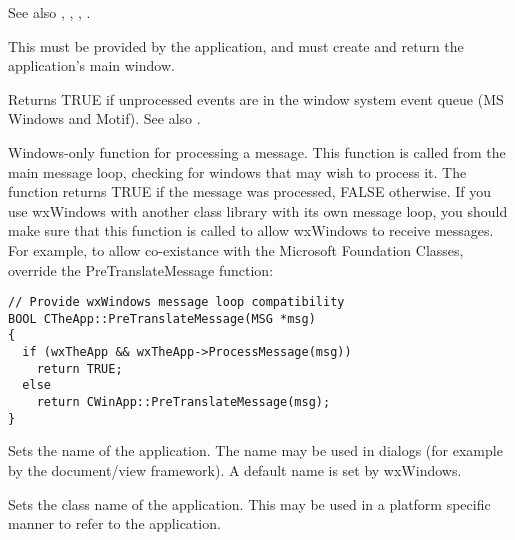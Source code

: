 See also , ,\rtfsp
{}, .

\label{wxapponinit}


This must be provided by the application, and must create and return the
application's main window.

\label{pending}


Returns TRUE if unprocessed events are in the window system event queue
(MS Windows and Motif). See also .

\label{wxappprocessmessage}


Windows-only function for processing a message. This function
is called from the main message loop, checking for windows that
may wish to process it. The function returns TRUE if the message
was processed, FALSE otherwise. If you use wxWindows with another class
library with its own message loop, you should make sure that this
function is called to allow wxWindows to receive messages. For example,
to allow co-existance with the Microsoft Foundation Classes, override
the PreTranslateMessage function:

\begin{verbatim}
// Provide wxWindows message loop compatibility
BOOL CTheApp::PreTranslateMessage(MSG *msg)
{
  if (wxTheApp && wxTheApp->ProcessMessage(msg))
    return TRUE;
  else
    return CWinApp::PreTranslateMessage(msg);
}
\end{verbatim}

\label{wxappsetappname}


Sets the name of the application. The name may be used in dialogs
(for example by the document/view framework). A default name is set by
wxWindows.

\label{wxappsetclassname}


Sets the class name of the application. This may be used in a platform specific
manner to refer to the application.

